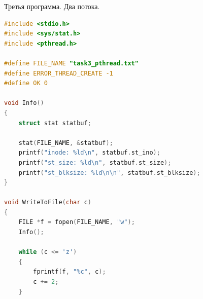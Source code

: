 \documentclass[a4paper,oneside,12pt]{extreport}
\begin{document}
\begin{task}
    \begin{figure}[ht!]
    \end{figure}

    \begin{figure}[ht!]
    \end{figure}

    \newpage

    Третья программа. Два потока.
    \begin{lstlisting}[language=C]
#include <stdio.h>
#include <sys/stat.h>
#include <pthread.h>

#define FILE_NAME "task3_pthread.txt"
#define ERROR_THREAD_CREATE -1
#define OK 0

void Info()
{
    struct stat statbuf;

    stat(FILE_NAME, &statbuf);
    printf("inode: %ld\n", statbuf.st_ino);
    printf("st_size: %ld\n", statbuf.st_size);
    printf("st_blksize: %ld\n\n", statbuf.st_blksize);
}

void WriteToFile(char c)
{
    FILE *f = fopen(FILE_NAME, "w");
    Info();

    while (c <= 'z')
    {
        fprintf(f, "%c", c);
        c += 2;
    }


\end{lstlisting}
\end{task}
\end{document}
